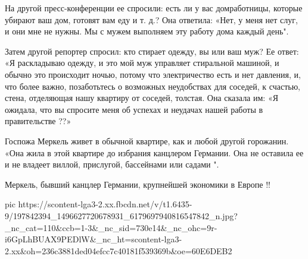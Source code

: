 На другой пресс-конференции ее спросили: есть ли у вас домработницы, которые
убирают ваш дом, готовят вам еду и т. д.? Она ответила: «Нет, у меня нет слуг,
и они мне не нужны. Мы с мужем выполняем эту работу дома каждый день".

Затем другой репортер спросил: кто стирает одежду, вы или ваш муж? Ее ответ: «Я
раскладываю одежду, и это мой муж управляет стиральной машиной, и обычно это
происходит ночью, потому что электричество есть и нет давления, и, что более
важно, позаботьтесь о возможных неудобствах для соседей, к счастью, стена,
отделяющая нашу квартиру от соседей, толстая. Она сказала им: «Я ожидала, что
вы спросите меня об успехах и неудачах нашей работы в правительстве ??»

Госпожа Меркель живет в обычной квартире, как и любой другой горожанин. «Она
жила в этой квартире до избрания канцлером Германии. Она не оставила ее и не
владеет виллой, прислугой, бассейнами или садами ".

Меркель, бывший канцлер Германии, крупнейшей экономики в Европе !!

\ifcmt
  pic https://scontent-lga3-2.xx.fbcdn.net/v/t1.6435-9/197842394_1496627720678931_6179697940816547842_n.jpg?_nc_cat=110&ccb=1-3&_nc_sid=730e14&_nc_ohc=9r-i6GpLhBUAX9PEDlW&_nc_ht=scontent-lga3-2.xx&oh=236c3881ded04efcc7c40181f539369b&oe=60E6DEB2
\fi

